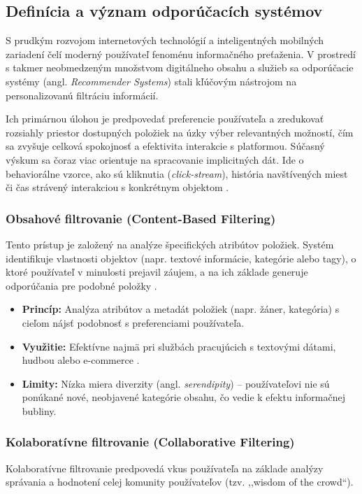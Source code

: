 
\subsection{Definícia a význam odporúčacích systémov}
S prudkým rozvojom internetových technológií a inteligentných mobilných zariadení čelí moderný používateľ fenoménu informačného preťaženia. V prostredí s takmer neobmedzeným množstvom digitálneho obsahu a služieb sa odporúčacie systémy (angl. \textit{Recommender Systems}) stali kľúčovým nástrojom na personalizovanú filtráciu informácií. 

Ich primárnou úlohou je predpovedať preferencie používateľa a 
zredukovať rozsiahly priestor dostupných položiek na úzky výber
 relevantných možností, čím sa zvyšuje celková spokojnosť 
 a efektivita interakcie s platformou. Súčasný výskum sa čoraz 
 viac orientuje na spracovanie implicitných dát. Ide o
  behaviorálne vzorce, ako sú kliknutia (\textit{click-stream}), 
  história navštívených miest či čas strávený interakciou s 
  konkrétnym objektom \cite{electronics11010141}.

\subsubsection{Obsahové filtrovanie (Content-Based Filtering)}
Tento prístup je založený na analýze špecifických atribútov položiek. Systém identifikuje vlastnosti objektov (napr. textové informácie, kategórie alebo tagy), o ktoré používateľ v minulosti prejavil záujem, a na ich základe generuje odporúčania pre podobné položky \cite{electronics11010141}.
\begin{itemize}
    \item \textbf{Princíp:} Analýza atribútov a metadát položiek (napr. žáner, kategória) s cieľom nájsť podobnosť s preferenciami používateľa.
    \item \textbf{Využitie:} Efektívne najmä pri službách pracujúcich s textovými dátami, hudbou alebo e-commerce \cite{electronics11010141}.
    \item \textbf{Limity:} Nízka miera diverzity (angl. \textit{serendipity}) – používateľovi nie sú ponúkané nové, neobjavené kategórie obsahu, čo vedie k efektu informačnej bubliny.
\end{itemize}

\subsubsection{Kolaboratívne filtrovanie (Collaborative Filtering)}
Kolaboratívne filtrovanie predpovedá vkus používateľa na základe analýzy správania a hodnotení celej komunity používateľov (tzv. ,,wisdom of the crowd``). 

